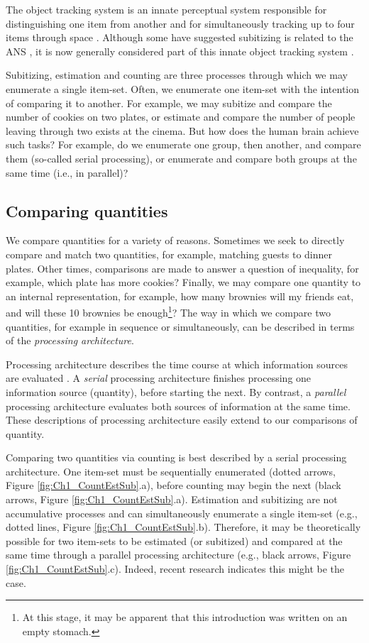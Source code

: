 The object tracking system is an innate perceptual system responsible for distinguishing one item from another and for simultaneously tracking up to four items through space \cite{feigenson2004core, pylyshyn1988tracking}. Although some have suggested subitizing is related to the ANS \cite{dehaene1994dissociable}, it is now generally considered part of this innate object tracking system \cite[but also see Revkin, Piazza, Izard, Cohen, \& Dehaene, 2008]{chesney2011evidence}\nocite{revkin2008does}. 

Subitizing, estimation and counting are three processes through which we may enumerate a single item-set. Often, we enumerate one item-set with the intention of comparing it to another. For example, we may subitize and compare the number of cookies on two plates, or estimate and compare the number of people leaving through two exists at the cinema. But how does the human brain achieve such tasks? For example, do we enumerate one group, then another, and compare them (so-called serial processing), or enumerate and compare both groups at the same time (i.e., in parallel)? 

\subsection{Comparing quantities}
We compare quantities for a variety of reasons. Sometimes we seek to directly compare and match two quantities, for example, matching guests to dinner plates. Other times, comparisons are made to answer a question of inequality, for example, which plate has more cookies? Finally, we may compare one quantity to an internal representation, for example, how many brownies will my friends eat, and will these 10 brownies be enough\footnote{At this stage, it may be apparent that this introduction was written on an empty stomach.}? The way in which we compare two quantities, for example in sequence or simultaneously, can be described in terms of the \textit{processing architecture}.

Processing architecture describes the time course at which information sources are evaluated \cite{Townsend_1995}. A \textit{serial} processing architecture finishes processing one information source (\ie quantity), before starting the next. By contrast, a \textit{parallel} processing architecture evaluates both sources of information at the same time. These descriptions of processing architecture easily extend to our comparisons of quantity.

Comparing two quantities via counting is best described by a serial processing architecture. One item-set must be sequentially enumerated (dotted arrows, Figure \ref{fig:Ch1_CountEstSub}.a), before counting may begin the next (black arrows, Figure \ref{fig:Ch1_CountEstSub}.a). Estimation and subitizing are not accumulative processes and can simultaneously enumerate a single item-set (e.g., dotted lines, Figure \ref{fig:Ch1_CountEstSub}.b). Therefore, it may be theoretically possible for two item-sets to be estimated (or subitized) and compared at the same time through a parallel processing architecture (e.g., black arrows, Figure \ref{fig:Ch1_CountEstSub}.c). Indeed, recent research indicates this might be the case. 

